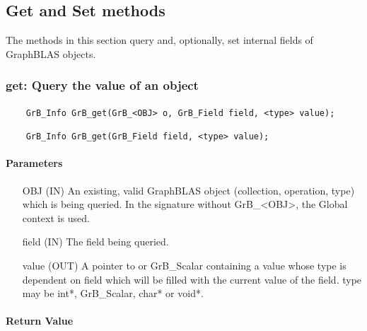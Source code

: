 \subsection{Get and Set methods}

The methods in this section query and, optionally, 
set internal fields of GraphBLAS objects.

\subsubsection{{\sf get}: Query the value of an object}

\paragraph{\syntax}

\begin{verbatim}
    GrB_Info GrB_get(GrB_<OBJ> o, GrB_Field field, <type> value);

    GrB_Info GrB_get(GrB_Field field, <type> value);
\end{verbatim}

\paragraph{Parameters}

\begin{itemize}[leftmargin=1.1in]
    \item[{\sf OBJ}] ({\sf IN}) An existing, valid GraphBLAS object (collection, operation, type) which is being queried.
                                In the signature without {\sf GrB\_<OBJ>}, the Global context is used.
    \item[{\sf field}] ({\sf IN}) The field being queried.
    \item[{\sf value}] ({\sf OUT}) A pointer to or {\sf GrB\_Scalar} containing a value whose type is dependent on {\sf field} which will be
                                 filled with the current value of the field. {\sf type} may be {\sf int*},
                                 {\sf GrB\_Scalar}, {\sf char*} or {\sf void*}.
\end{itemize}

\paragraph{Return Value}

